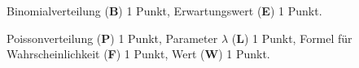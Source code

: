 \begin{bewertung}
\begin{teilaufgaben}
\item
Binomialverteilung ({\bf B}) 1 Punkt, Erwartungswert ({\bf E}) 1 Punkt.
\item
Poissonverteilung ({\bf P}) 1 Punkt, 
Parameter $\lambda$ ({\bf L}) 1 Punkt,
Formel für Wahrscheinlichkeit ({\bf F}) 1 Punkt,
Wert ({\bf W}) 1 Punkt.
\end{teilaufgaben}
\end{bewertung}

